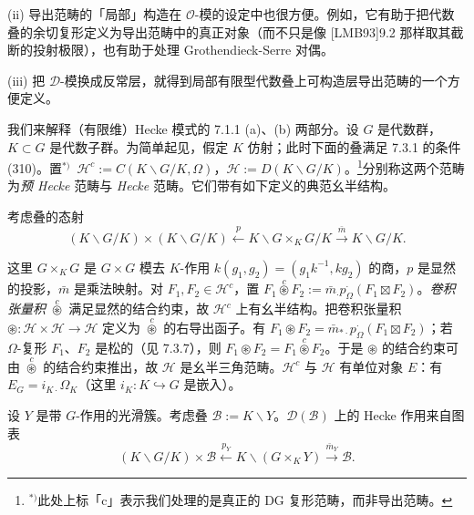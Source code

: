 (ii) 导出范畴的「局部」构造在 $\mathcal{O}$-模的设定中也很方便。例如，它有助于把代数叠的余切复形定义为导出范畴中的真正对象（而不只是像 [LMB93]9.2 那样取其截断的投射极限），也有助于处理 Grothendieck-Serre 对偶。

(iii) 把 $\mathcal{D}$-模换成反常层，就得到局部有限型代数叠上可构造层导出范畴的一个方便定义。


 我们来解释（有限维）Hecke 模式的 7.1.1 (a)、(b) 两部分。设 $G$ 是代数群，$K\subset G$ 是代数子群。为简单起见，假定 $K$ 仿射；此时下面的叠满足 7.3.1 的条件 (310)。置$^{*)}$\ $\mathcal{H}^{c}:=C(K\backslash G/K,\Omega)$，$\mathcal{H}:=D(K\backslash G/K)$。\footnote{$^{*)}$此处上标「c」表示我们处理的是真正的 DG 复形范畴，而非导出范畴。}分别称这两个范畴为\emph{预 Hecke} 范畴与 \emph{Hecke} 范畴。它们带有如下定义的典范幺半结构。

考虑叠的态射
\begin{equation}\tag{318}
(K\backslash G/K)\times(K\backslash G/K)\xleftarrow{p}K\backslash G\times_{K}G/K\xrightarrow{\bar m}K\backslash G/K.
\end{equation}


这里 $G\times_{K}G$ 是 $G\times G$ 模去 $K$-作用 $k(g_{1},g_{2})=(g_{1}k^{-1},kg_{2})$ 的商，$p$ 是显然的投影，$\bar m$ 是乘法映射。对 $F_{1},F_{2}\in\mathcal{H}^{c}$，置 $F_{1}\overset{c}{\circledast}F_{2}:=\bar m_{\cdot}p^{\cdot}_{\Omega}(F_{1}\boxtimes F_{2})$。\emph{卷积张量积} $\overset{c}{\circledast}$ 满足显然的结合约束，故 $\mathcal{H}^{c}$ 上有幺半结构。把卷积张量积 $\circledast:\mathcal{H}\times\mathcal{H}\longrightarrow\mathcal{H}$ 定义为 $\overset{c}{\circledast}$ 的右导出函子。有 $F_{1}\circledast F_{2}=\bar m_{*\cdot}p^{\cdot}_{\Omega}(F_{1}\boxtimes F_{2})$；若 $\Omega$-复形 $F_{1}$、$F_{2}$ 是松的（见 7.3.7），则 $F_{1}\circledast F_{2}=F_{1}\overset{c}{\circledast}F_{2}$。于是 $\circledast$ 的结合约束可由 $\overset{c}{\circledast}$ 的结合约束推出，故 $\mathcal{H}$ 是幺半三角范畴。$\mathcal{H}^{c}$ 与 $\mathcal{H}$ 有单位对象 $E$：有 $E_{G}=i_{K\cdot}\Omega_{K}$（这里 $i_{K}:K\hookrightarrow G$ 是嵌入）。

设 $Y$ 是带 $G$-作用的光滑簇。考虑叠 $\mathcal{B}:=K\backslash Y$。$\mathcal{D}(\mathcal{B})$ 上的 Hecke 作用来自图表
\begin{equation}\tag{319}
(K\backslash G/K)\times\mathcal{B}\xleftarrow{p_{Y}}K\backslash(G\times_{K}Y)\xrightarrow{\bar m_{Y}}\mathcal{B}.
\end{equation}

